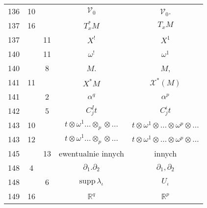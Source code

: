\documentclass[a4paper,11pt]{article}
\newcommand{\mb}{\mathbb}
\newcommand{\mc}{\mathcal}
\newcommand{\mr}{\mathrm}
\newcommand{\pr}{\partial}
\newcommand{\ld}{\ldots}
\newcommand{\ot}{\otimes}
\newcommand{\supp}{\mr{supp}}
\newcommand{\al}{\alpha}
\newcommand{\io}{\iota}
\newcommand{\la}{\lambda}
\newcommand{\om}{\omega}
\newcommand{\R}{\mb{R}}
\newcommand{\V}{\mc{V}}
\newcommand{\X}{\mc{X}}
\begin{document}
\begin{center}
\begin{tabular}{|c|c|c|c|c|}
    136 & 10 & & $\V_{ 0 }$ & $\V_{ 0 }$. \\
    137 & 16 & & $T^{ * }_{ x }M$ & $T_{ x }M$ \\
    137 & & 11 & $X^{ ! }$ & $X^{ 1 }$ \\
    140 & & 11 & $\om^{ ! }$ & $\om^{ 1 }$ \\
    140 & &  8 & $M$. & $M$, \\
    141 & 11 & & $X^{ * } M$ & $\X^{ * }( M )$ \\
    141 & &  2 & $\al^{ q }$ & $\al^{ p }$ \\
    142 & &  5 & $C^{ I }_{ j } t$ & $C^{ i }_{ j } t$ \\
    143 & 10 & & $t \ot \om^{ 1 } \ld \ot_{ p } \ot \ld$
           & $t \ot \om^{ 1 } \ot \ld \ot \om^{ p } \ot \ld$ \\
    143 & 12 & & $t \ot \om^{ 1 } \ld \ot_{ p } \ot \ld$
           & $t \ot \om^{ 1 } \ot \ld \ot \om^{ p } \ot \ld$ \\
    145 & & 13 & ewentualnie innych & innych \\
    148 &  4 & & $\pr_{ 1 }.\pr_{ 2 }$ & $\pr_{ 1 }, \pr_{ 2 }$ \\
    148 & &  6 & $\supp\, \la_{ \io }$ & $U_{ \io }$ \\
    149 & 16 & & $\R^{ q }$ & $\R^{ p }$ \\
    \hline
  \end{tabular}


\end{center}
\end{document}
